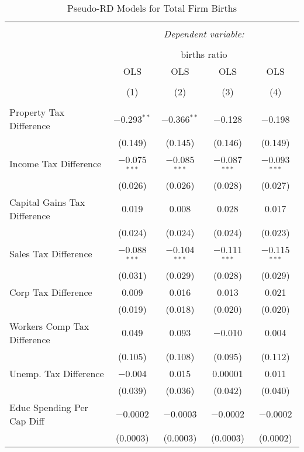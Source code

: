 \documentclass{article}
\begin{document}
\begin{table}[!htbp] \centering 
  \caption{Pseudo-RD Models for  Total Firm Births} 
  \label{} 
\begin{tabular}{@{\extracolsep{5pt}}lcccc} 
\\[-1.8ex]\hline 
\hline \\[-1.8ex] 
 & \multicolumn{4}{c}{\textit{Dependent variable:}} \\ 
\cline{2-5} 
\\[-1.8ex] & \multicolumn{4}{c}{births ratio} \\ 
 & OLS & OLS & OLS & OLS \\ 
\\[-1.8ex] & (1) & (2) & (3) & (4)\\ 
\hline \\[-1.8ex] 
 Property Tax Difference & $-$0.293$^{**}$ & $-$0.366$^{**}$ & $-$0.128 & $-$0.198 \\ 
  & (0.149) & (0.145) & (0.146) & (0.149) \\ 
  Income Tax Difference & $-$0.075$^{***}$ & $-$0.085$^{***}$ & $-$0.087$^{***}$ & $-$0.093$^{***}$ \\ 
  & (0.026) & (0.026) & (0.028) & (0.027) \\ 
  Capital Gains Tax Difference & 0.019 & 0.008 & 0.028 & 0.017 \\ 
  & (0.024) & (0.024) & (0.024) & (0.023) \\ 
  Sales Tax Difference & $-$0.088$^{***}$ & $-$0.104$^{***}$ & $-$0.111$^{***}$ & $-$0.115$^{***}$ \\ 
  & (0.031) & (0.029) & (0.028) & (0.029) \\ 
  Corp Tax Difference & 0.009 & 0.016 & 0.013 & 0.021 \\ 
  & (0.019) & (0.018) & (0.020) & (0.020) \\ 
  Workers Comp Tax Difference & 0.049 & 0.093 & $-$0.010 & 0.004 \\ 
  & (0.105) & (0.108) & (0.095) & (0.112) \\ 
  Unemp. Tax Difference & $-$0.004 & 0.015 & 0.00001 & 0.011 \\ 
  & (0.039) & (0.036) & (0.042) & (0.040) \\ 
  Educ Spending Per Cap Diff & $-$0.0002 & $-$0.0003 & $-$0.0002 & $-$0.0002 \\ 
  & (0.0003) & (0.0003) & (0.0003) & (0.0002) \\ 

\end{tabular}
\end{table}
\end{document}
